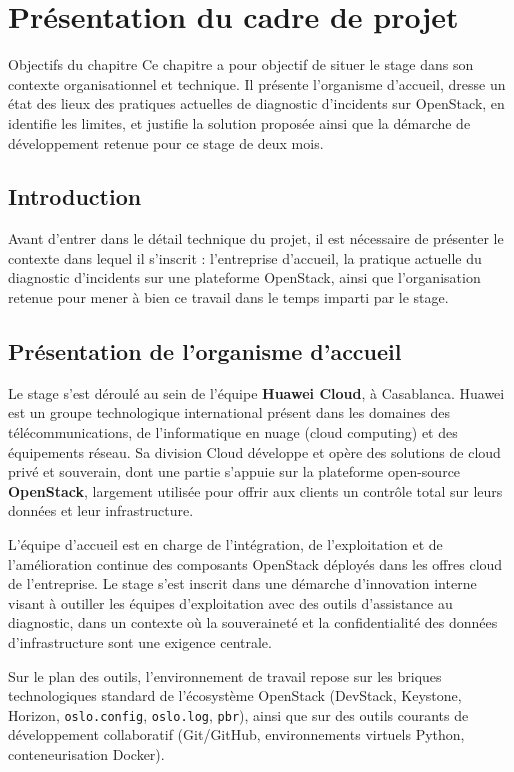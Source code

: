 \documentclass[a4paper,11pt,oneside]{report}
\newcommand{\chapterobjectives}[1]{%
\begin{block}{Objectifs du chapitre}
#1
\end{block}
}
\begin{document}
\chapter{Présentation du cadre de projet}
\chapterobjectives{%
Ce chapitre a pour objectif de situer le stage dans son contexte organisationnel et technique. Il présente l'organisme d'accueil, dresse un état des lieux des pratiques actuelles de diagnostic d'incidents sur OpenStack, en identifie les limites, et justifie la solution proposée ainsi que la démarche de développement retenue pour ce stage de deux mois.
}

\section{Introduction}
Avant d'entrer dans le détail technique du projet, il est nécessaire de présenter le contexte dans lequel il s'inscrit : l'entreprise d'accueil, la pratique actuelle du diagnostic d'incidents sur une plateforme OpenStack, ainsi que l'organisation retenue pour mener à bien ce travail dans le temps imparti par le stage.

\section{Présentation de l'organisme d'accueil}
Le stage s'est déroulé au sein de l'équipe \textbf{Huawei Cloud}, à Casablanca. Huawei est un groupe technologique international présent dans les domaines des télécommunications, de l'informatique en nuage (cloud computing) et des équipements réseau. Sa division Cloud développe et opère des solutions de cloud privé et souverain, dont une partie s'appuie sur la plateforme open-source \textbf{OpenStack}, largement utilisée pour offrir aux clients un contrôle total sur leurs données et leur infrastructure.

L'équipe d'accueil est en charge de l'intégration, de l'exploitation et de l'amélioration continue des composants OpenStack déployés dans les offres cloud de l'entreprise. Le stage s'est inscrit dans une démarche d'innovation interne visant à outiller les équipes d'exploitation avec des outils d'assistance au diagnostic, dans un contexte où la souveraineté et la confidentialité des données d'infrastructure sont une exigence centrale.

Sur le plan des outils, l'environnement de travail repose sur les briques technologiques standard de l'écosystème OpenStack (DevStack, Keystone, Horizon, \texttt{oslo.config}, \texttt{oslo.log}, \texttt{pbr}), ainsi que sur des outils courants de développement collaboratif (Git/GitHub, environnements virtuels Python, conteneurisation Docker).
\end{document}
